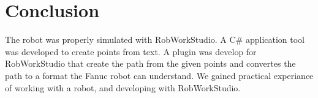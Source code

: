 \section{Conclusion}
\label{sec:conclusion}

The robot was properly simulated with RobWorkStudio. A C\# application tool was developed to create points from text. A plugin was develop for RobWorkStudio that create the path from the given points and convertes the path to a format the Fanuc robot can understand. We gained practical experiance of working with a robot, and developing with RobWorkStudio.

